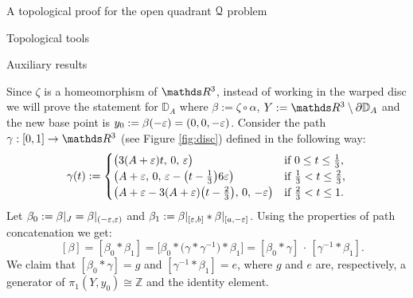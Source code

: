 \documentclass[11pt, a4paper, english, twoside, notitlepage, openright]{report}
\begin{document}
\begin{chapter}{A topological proof for the open quadrant $\mathcal{Q}$ problem}
\begin{section}{Topological tools}
\begin{subsection}{Auxiliary results}
\begin{lemma}
\begin{Proof}
\vspace{1mm}

Since $\zeta$ is a homeomorphism of $\R^3$, instead of working in the warped disc we will prove the statement for ${\mathbb D}_A$ where $\beta:=\zeta\circ\alpha$, $Y:=\R^3\setminus\partial{\mathbb D}_A$ and the new base point is $y_0:=\beta(-\varepsilon)=(0,0,-\varepsilon)$. Consider the path $\gamma:[0,1]\to\R^3$ (see Figure \ref{fig:disc}) defined in the following way:
$$
\gamma(t):=
\begin{cases}
\big(3(A+\varepsilon)t,\,0,\,\varepsilon\big)&\text{if $0\le t\le\frac{1}{3}$,}\\
\big(A+\varepsilon,\, 0,\, \varepsilon-\big(t-\frac{1}{3}\big)6\varepsilon\big)&\text{if $\frac{1}{3}<t\le \frac{2}{3}$,}\\
\big(A+\varepsilon-3(A+\varepsilon)\big(t-\frac{2}{3}\big),\, 0,\, -\varepsilon\big)&\text{if $\frac{2}{3}<t\le 1$}.
\end{cases}
$$
Let $\beta_0:=\beta|_{J}=\beta|_{(-\varepsilon,\varepsilon)}$ and $\beta_1:=\beta|_{[\varepsilon,b]}\ast\beta|_{[a,-\varepsilon]}$. Using the properties of path concatenation we get:
$$
\quad[\beta]=[\beta_0\ast\beta_1]=\big[\beta_0\ast\big(\gamma\ast\gamma^{-1}\big)\ast\beta_1\big]=[\beta_0\ast\gamma]\,\cdot\,[\gamma^{-1}\ast\beta_1].
$$
We claim that $[\beta_0\ast\gamma]=g$ and $[\gamma^{-1}\ast\beta_1]=e$, where $g$ and $e$ are, respectively, a generator of $\pi_1(Y,y_0)\cong{\mathbb Z}$ and the identity element.


\end{Proof}
\end{lemma}
\end{subsection}
\end{section}
\end{chapter}
\end{document}
